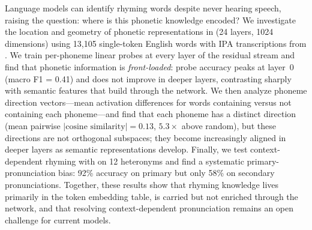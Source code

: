 Language models can identify rhyming words despite never hearing speech, raising the question: where is this phonetic knowledge encoded?
We investigate the location and geometry of phonetic representations in \gptmed (24 layers, 1024 dimensions) using 13{,}105 single-token English words with IPA transcriptions from \wikipron.
We train per-phoneme linear probes at every layer of the residual stream and find that phonetic information is \emph{front-loaded}: probe accuracy peaks at layer~0 (macro F1 = 0.41) and does not improve in deeper layers, contrasting sharply with semantic features that build through the network.
We then analyze phoneme direction vectors---mean activation differences for words containing versus not containing each phoneme---and find that each phoneme has a distinct direction (mean pairwise $|\text{cosine similarity}| = 0.13$, $5.3\times$ above random), but these directions are not orthogonal subspaces; they become increasingly aligned in deeper layers as semantic representations develop.
Finally, we test context-dependent rhyming with \gptfour on 12 heteronyms and find a systematic primary-pronunciation bias: 92\% accuracy on primary but only 58\% on secondary pronunciations.
Together, these results show that rhyming knowledge lives primarily in the token embedding table, is carried but not enriched through the network, and that resolving context-dependent pronunciation remains an open challenge for current models.
